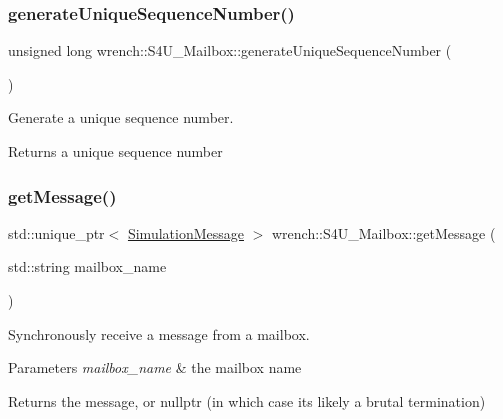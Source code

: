 \subsubsection{\texorpdfstring{generate\+Unique\+Sequence\+Number()}{generateUniqueSequenceNumber()}}
{\footnotesize\ttfamily unsigned long wrench\+::\+S4\+U\+\_\+\+Mailbox\+::generate\+Unique\+Sequence\+Number (\begin{DoxyParamCaption}{ }\end{DoxyParamCaption})\hspace{0.3cm}{\ttfamily [static]}}



Generate a unique sequence number. 

\begin{DoxyReturn}{Returns}
a unique sequence number 
\end{DoxyReturn}
\mbox{\label{classwrench_1_1_s4_u___mailbox_add51ac46be430cd18ba395ea1aedfaa2}} 
\subsubsection{\texorpdfstring{get\+Message()}{getMessage()}\hspace{0.1cm}{\footnotesize\ttfamily [1/2]}}
{\footnotesize\ttfamily std\+::unique\+\_\+ptr$<$ \hyperlink{classwrench_1_1_simulation_message}{Simulation\+Message} $>$ wrench\+::\+S4\+U\+\_\+\+Mailbox\+::get\+Message (\begin{DoxyParamCaption}\item[{std\+::string}]{mailbox\+\_\+name }\end{DoxyParamCaption})\hspace{0.3cm}{\ttfamily [static]}}



Synchronously receive a message from a mailbox. 


\begin{DoxyParams}{Parameters}
{\em mailbox\+\_\+name} & the mailbox name \\
\hline
\end{DoxyParams}
\begin{DoxyReturn}{Returns}
the message, or nullptr (in which case it\textquotesingle{}s likely a brutal termination)
\end{DoxyReturn}

